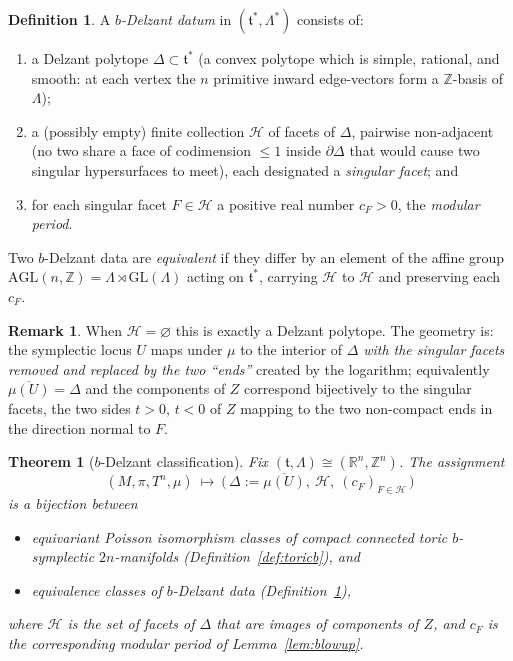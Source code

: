 \documentclass{amsart}
\newtheorem{theorem}{Theorem}
\theoremstyle{definition}
\newtheorem{definition}{Definition}
\newtheorem{remark}{Remark}
\begin{document}
\begin{definition}\label{def:bdelzant}
A \emph{$b$-Delzant datum} in $(\mathfrak t^*,\Lambda^*)$ consists of:
\begin{enumerate}
\item a Delzant polytope $\Delta\subset\mathfrak t^*$ (a convex polytope which
is simple, rational, and smooth: at each vertex the $n$ primitive inward
edge-vectors form a $\mathbb Z$-basis of $\Lambda$);
\item a (possibly empty) finite collection $\mathcal H$ of facets of $\Delta$,
pairwise non-adjacent (no two share a face of codimension $\le 1$ inside
$\partial\Delta$ that would cause two singular hypersurfaces to meet), each
designated a \emph{singular facet}; and
\item for each singular facet $F\in\mathcal H$ a positive real number
$c_F>0$, the \emph{modular period}.
\end{enumerate}
Two $b$-Delzant data are \emph{equivalent} if they differ by an element of the
affine group $\mathrm{AGL}(n,\mathbb Z)=\Lambda\rtimes \mathrm{GL}(\Lambda)$
acting on $\mathfrak t^*$, carrying $\mathcal H$ to $\mathcal H$ and preserving
each $c_F$.
\end{definition}

\begin{remark}
When $\mathcal H=\varnothing$ this is exactly a Delzant polytope. The
geometry is: the symplectic locus $U$ maps under $\mu$ to the interior of
$\Delta$ \emph{with the singular facets removed and replaced by the two
``ends''} created by the logarithm; equivalently $\overline{\mu(U)}=\Delta$
and the components of $Z$ correspond bijectively to the singular facets, the
two sides $t>0$, $t<0$ of $Z$ mapping to the two non-compact ends in the
direction normal to $F$.
\end{remark}

\begin{theorem}[$b$-Delzant classification]\label{thm:main}
Fix $(\mathfrak t,\Lambda)\cong(\mathbb R^n,\mathbb Z^n)$. The assignment
\[
(M,\pi,T^n,\mu)\ \longmapsto\
\bigl(\,\Delta:=\overline{\mu(U)},\ \mathcal H,\ (c_F)_{F\in\mathcal H}\,\bigr)
\]
is a bijection between
\begin{itemize}
\item equivariant Poisson isomorphism classes of compact connected toric
$b$-symplectic $2n$-manifolds (Definition~\ref{def:toricb}), and
\item equivalence classes of $b$-Delzant data
(Definition~\ref{def:bdelzant}),
\end{itemize}
where $\mathcal H$ is the set of facets of $\Delta$ that are images of
components of $Z$, and $c_F$ is the corresponding modular period of
Lemma~\ref{lem:blowup}.
\end{theorem}
\end{document}
